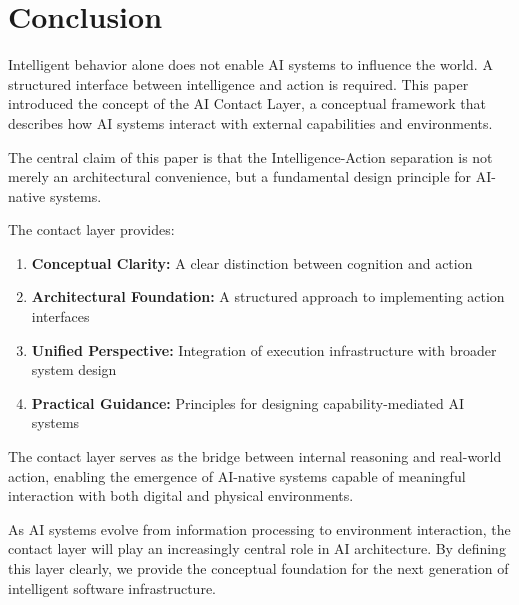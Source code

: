 \section{Conclusion}

Intelligent behavior alone does not enable AI systems to influence the world. A structured interface between intelligence and action is required. This paper introduced the concept of the AI Contact Layer, a conceptual framework that describes how AI systems interact with external capabilities and environments.

The central claim of this paper is that the Intelligence-Action separation is not merely an architectural convenience, but a fundamental design principle for AI-native systems.

The contact layer provides:
\begin{enumerate}[label=\arabic*.]
\item \textbf{Conceptual Clarity:} A clear distinction between cognition and action
\item \textbf{Architectural Foundation:} A structured approach to implementing action interfaces
\item \textbf{Unified Perspective:} Integration of execution infrastructure with broader system design
\item \textbf{Practical Guidance:} Principles for designing capability-mediated AI systems
\end{enumerate}

The contact layer serves as the bridge between internal reasoning and real-world action, enabling the emergence of AI-native systems capable of meaningful interaction with both digital and physical environments.

As AI systems evolve from information processing to environment interaction, the contact layer will play an increasingly central role in AI architecture. By defining this layer clearly, we provide the conceptual foundation for the next generation of intelligent software infrastructure.
